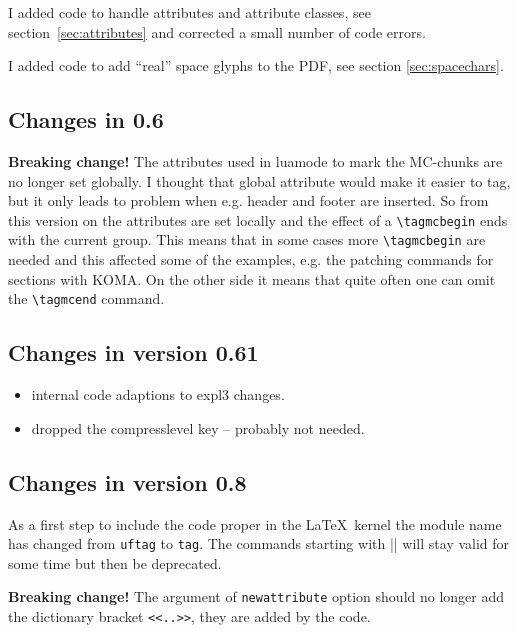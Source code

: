 \documentclass[DIV=12,parskip=half-,bibliography=totoc]{scrartcl}
\newcommand\PDF{PDF}
\begin{document}
I added code to handle attributes and attribute classes, see section~\ref{sec:attributes} and corrected a small number of code errors.

I added code to add \enquote{real} space glyphs to the \PDF{}, see section \ref{sec:spacechars}.



\subsection{Changes in 0.6}



\textbf{Breaking change!} The attributes used in luamode to mark the MC-chunks are no longer set globally. I thought that global attribute would make it easier to tag, but it only leads to problem when e.g. header and footer are inserted. So from this version on the attributes are set locally and the effect of a \verb+\tagmcbegin+ ends with the current group. This means that in some cases more \verb+\tagmcbegin+ are needed and  this affected some of the examples, e.g. the patching commands for sections with KOMA. On the other side it means that quite often one can omit the \verb+\tagmcend+ command.




\subsection{Changes in version 0.61}



\begin{itemize}
\item internal code adaptions to expl3 changes.
\item dropped the compresslevel key  -- probably not needed.
\end{itemize}




\subsection{Changes in version 0.8}



As a first step to include the code proper in the \LaTeX\ kernel the module name has changed from \texttt{uftag} to \texttt{tag}. The commands starting with |\uftag| will stay valid for some time but then be deprecated.

\textbf{Breaking change!} The argument of \texttt{newattribute} option should no longer add the dictionary bracket \verb+<<..>>+, they are added by the code.
\end{document}
